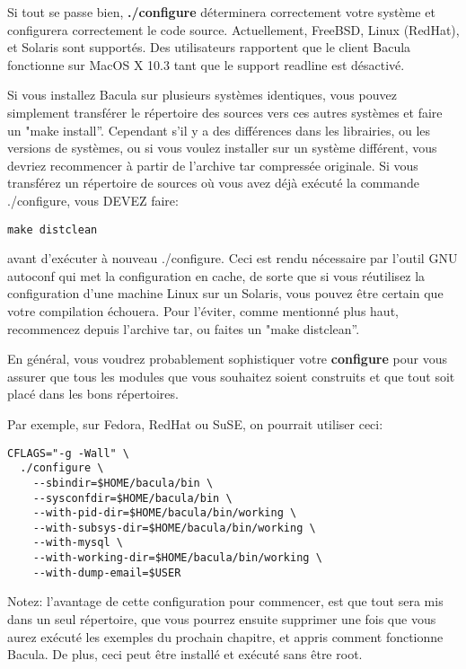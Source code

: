 Si tout se passe bien, {\bf ./configure} d\'eterminera correctement votre
syst\`eme et configurera correctement le code source. Actuellement, FreeBSD,
Linux (RedHat), et Solaris sont support\'es. Des utilisateurs rapportent que
le client Bacula fonctionne sur MacOS X 10.3 tant que le support readline est
d\'esactiv\'e. 

Si vous installez Bacula sur plusieurs syst\`emes identiques, vous pouvez
simplement transf\'erer le r\'epertoire des sources vers ces autres syst\`emes
et faire un "make install''. Cependant s'il y a des diff\'erences dans les
librairies, ou les versions de syst\`emes, ou si vous voulez installer sur un
syst\`eme diff\'erent, vous devriez recommencer \`a partir de l'archive tar
compress\'ee originale. Si vous transf\'erez un r\'epertoire de sources o\`u
vous avez d\'ej\`a ex\'ecut\'e la commande ./configure, vous DEVEZ faire: 

\footnotesize
\begin{verbatim}
make distclean
\end{verbatim}
\normalsize

avant d'ex\'ecuter \`a nouveau ./configure. Ceci est rendu n\'ecessaire par
l'outil GNU autoconf qui met la configuration en cache, de sorte que si vous
r\'eutilisez la configuration d'une machine Linux sur un Solaris, vous pouvez
\^etre certain que votre compilation \'echouera. Pour l'\'eviter, comme
mentionn\'e plus haut, recommencez depuis l'archive tar, ou faites un "make
distclean''. 

En g\'en\'eral, vous voudrez probablement sophistiquer votre {\bf configure}
pour vous assurer que tous les modules que vous souhaitez soient construits et
que tout soit plac\'e dans les bons r\'epertoires. 

Par exemple, sur Fedora, RedHat ou SuSE, on pourrait utiliser ceci: 

\footnotesize
\begin{verbatim}
CFLAGS="-g -Wall" \
  ./configure \
    --sbindir=$HOME/bacula/bin \
    --sysconfdir=$HOME/bacula/bin \
    --with-pid-dir=$HOME/bacula/bin/working \
    --with-subsys-dir=$HOME/bacula/bin/working \
    --with-mysql \
    --with-working-dir=$HOME/bacula/bin/working \
    --with-dump-email=$USER
\end{verbatim}
\normalsize

Notez: l'avantage de cette configuration pour commencer, est que tout sera mis
dans un seul r\'epertoire, que vous pourrez ensuite supprimer une fois que
vous aurez ex\'ecut\'e les exemples du prochain chapitre, et appris comment
fonctionne Bacula. De plus, ceci peut \^etre install\'e et ex\'ecut\'e sans
\^etre root. 

